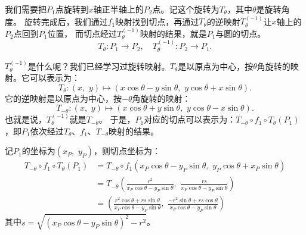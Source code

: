\documentclass[12pt,UTF8,fontset=none]{ctexbook}
\begin{document}
我们需要把$P_1$点旋转到$x$轴正半轴上的$P_2$点。记这个旋转为$T_\theta$，其中$\theta$是旋转角度。
旋转完成后，我们通过$f_1$映射找到切点，再通过$T_\theta$的逆映射$T_\theta^{(-1)}$让$x$轴上的$P_2$点回到$P_1$位置，
而切点经过$T_\theta^{(-1)}$映射的结果，就是$P_1$与圆的切点。
$$T_\theta: P_1 \longrightarrow P_2, \quad T_\theta^{(-1)}: P_2 \longrightarrow P_1.$$

$T_\theta^{(-1)}$是什么呢？我们已经学习过旋转映射。$T_\theta$是以原点为中心，按$\theta$角旋转的映射。它可以表示为：
$$T_\theta: (x,\,\, y) \mapsto (x\cos{\theta} - y\sin{\theta},\,\,y\cos{\theta} + x\sin{\theta}).$$
它的逆映射是以原点为中心，按$-\theta$角旋转的映射：
$$T_{-\theta}: (x,\,\, y) \mapsto (x\cos{\theta} + y\sin{\theta},\,\,y\cos{\theta} - x\sin{\theta}).$$
也就是说，$T_\theta^{(-1)}$就是$T_{-\theta}$。
于是，$P_1$对应的切点可以表示为：$T_{-\theta}\circ f_1\circ T_\theta(P_1)$，即$P_1$依次经过$T_\theta$、$f_1$、$T_{-\theta}$映射的结果。

记$P_1$的坐标为$(x_P,\,\,y_P)$，则切点坐标为：
\begin{align*}
    T_{-\theta}\circ f_1\circ T_\theta(P_1) &= T_{-\theta}\circ f_1(x_P\cos{\theta} - y_P\sin{\theta},\,\,y_P\cos{\theta} + x_P\sin{\theta})  \\
    &= T_{-\theta}\left(\frac{r^2}{x_P\cos{\theta} - y_P\sin{\theta}},\,\, \frac{rs}{x_P\cos{\theta} - y_P\sin{\theta}}\right)  \\
    &= \left(\frac{r^2\cos{\theta} + rs\sin{\theta}}{x_P\cos{\theta} - y_P\sin{\theta}},\,\, \frac{-r^2\sin{\theta} + rs\cos{\theta}}{x_P\cos{\theta} - y_P\sin{\theta}}\right) 
\end{align*}
其中$s = \sqrt{(x_P\cos{\theta} - y_P\sin{\theta})^2 - r^2}$。
\end{document}
